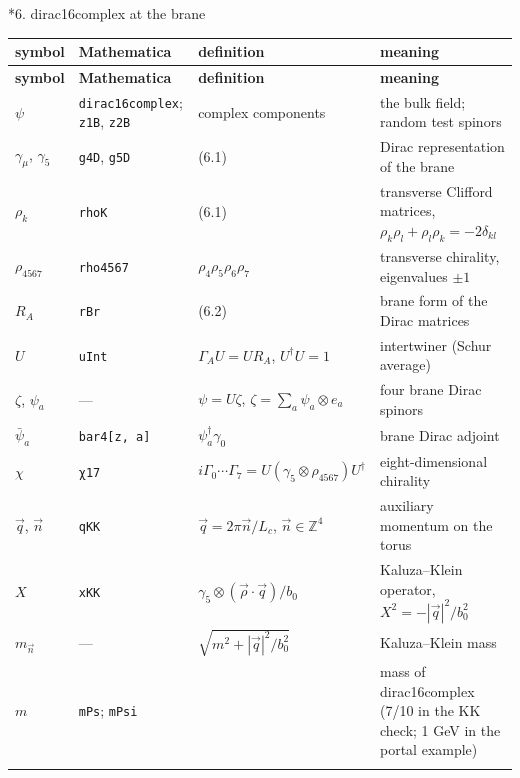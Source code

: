 \documentclass[10pt,a4paper]{article}
\makeatletter
\renewcommand\section{\@startsection{section}{1}{\z@}{-3.5ex \@plus -1ex \@minus -.2ex}{2.3ex \@plus.2ex}{\normalfont\Large\bfseries\raggedright}}
\makeatother
\begin{document}
\section*{6. dirac16complex at the brane}
{\small
\begin{longtable}{>{\raggedright\arraybackslash}p{}>{\raggedright\arraybackslash}p{}>{\raggedright\arraybackslash}p{}>{\raggedright\arraybackslash}p{}}
\toprule
\textbf{symbol} & \textbf{Mathematica} & \textbf{definition} & \textbf{meaning} \\
\midrule\endfirsthead
\toprule
\textbf{symbol} & \textbf{Mathematica} & \textbf{definition} & \textbf{meaning} \\
\midrule\endhead
\endfoot
\bottomrule\endlastfoot
$\psi$ & \texttt{dirac16complex}; \texttt{z1B}, \texttt{z2B} & 16 complex components & the bulk field; random test spinors \\
$\gamma_\mu$, $\gamma_5$ & \texttt{g4D}, \texttt{g5D} & (6.1) & Dirac representation of the brane \\
$\rho_k$ & \texttt{rhoK} & (6.1) & transverse Clifford matrices, $\rho_k\rho_l+\rho_l\rho_k=-2\delta_{kl}$ \\
$\rho_{4567}$ & \texttt{rho4567} & $\rho_4\rho_5\rho_6\rho_7$ & transverse chirality, eigenvalues $\pm1$ \\
$R_A$ & \texttt{rBr} & (6.2) & brane form of the Dirac matrices \\
$U$ & \texttt{uInt} & $\Gamma_AU=UR_A$, $U^\dagger U=1$ & intertwiner (Schur average) \\
$\zeta$, $\psi_a$ & — & $\psi=U\zeta$, $\zeta=\sum_a\psi_a\otimes e_a$ & four brane Dirac spinors \\
$\bar\psi_a$ & \texttt{bar4[z, a]} & $\psi_a^\dagger\gamma_0$ & brane Dirac adjoint \\
$\chi$ & \texttt{χ17} & $i\Gamma_0\cdots\Gamma_7=U(\gamma_5\otimes\rho_{4567})U^\dagger$ & eight-dimensional chirality \\
$\vec q$, $\vec n$ & \texttt{qKK} & $\vec q=2\pi\vec n/L_c$, $\vec n\in\mathbb Z^4$ & auxiliary momentum on the torus \\
$X$ & \texttt{xKK} & $\gamma_5\otimes(\vec\rho\cdot\vec q)/b_0$ & Kaluza–Klein operator, $X^2=-|\vec q|^2/b_0^2$ \\
$m_{\vec n}$ & — & $\sqrt{m^2+|\vec q|^2/b_0^2}$ & Kaluza–Klein mass \\
$m$ & \texttt{mPs}; \texttt{mPsi} &  & mass of dirac16complex (7/10 in the KK check; 1 GeV in the portal example) \\*
\end{longtable}}
\end{document}
